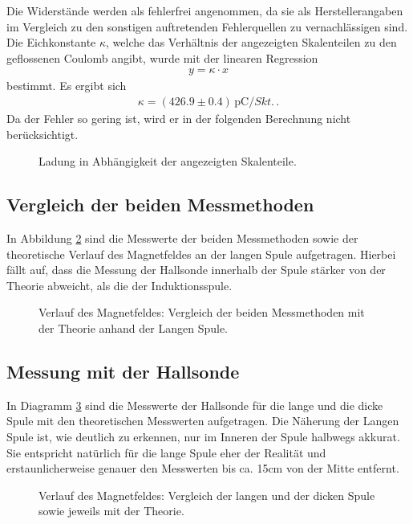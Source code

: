 \documentclass[12pt,a4paper,titlepage,headinclude,bibtotoc]{scrartcl}
\begin{document}
Die Widerstände werden als fehlerfrei angenommen, da sie als Herstellerangaben im Vergleich zu den sonstigen auftretenden Fehlerquellen zu vernachlässigen sind.
Die Eichkonstante $\kappa$, welche das Verhältnis der angezeigten Skalenteilen zu den geflossenen Coulomb angibt, wurde mit der linearen Regression
\begin{align*}
	y=\kappa\cdot x
\end{align*}
bestimmt.
Es ergibt sich
\begin{align}
	\kappa=(426.9 \pm 0.4)\,\si{\pico\coulomb\per Skt.}\,.
\end{align}
Da der Fehler so gering ist, wird er in der folgenden Berechnung nicht berücksichtigt.
\begin{figure}[!htb]
	\centering
	
	\caption{Ladung in Abhängigkeit der angezeigten Skalenteile.}
	\label{fig:Eichen}
\end{figure}

\subsection{Vergleich der beiden Messmethoden}
In Abbildung \ref{fig:LangIndHall} sind die Messwerte der beiden Messmethoden sowie der theoretische Verlauf des Magnetfeldes an der langen Spule aufgetragen.
Hierbei fällt auf, dass die Messung der Hallsonde innerhalb der Spule stärker von der Theorie abweicht, als die der Induktionsspule.
\begin{figure}[!htb]
	\centering
	
	\caption{Verlauf des Magnetfeldes: Vergleich der beiden Messmethoden mit der Theorie anhand der Langen Spule.}
	\label{fig:LangIndHall}
\end{figure}
\subsection{Messung mit der Hallsonde}
In Diagramm \ref{fig:HallVergleich} sind die Messwerte der Hallsonde für die lange und die dicke Spule mit den theoretischen Messwerten aufgetragen.
Die Näherung der Langen Spule ist, wie deutlich zu erkennen, nur im Inneren der Spule halbwegs akkurat.
Sie entspricht natürlich für die lange Spule eher der Realität und erstaunlicherweise genauer den Messwerten bis ca. 15cm von der Mitte entfernt.

\begin{figure}[!htb]
	\centering
	
	\caption{Verlauf des Magnetfeldes: Vergleich der langen und der dicken Spule sowie jeweils mit der Theorie.}
	\label{fig:HallVergleich}
\end{figure}
\end{document}
